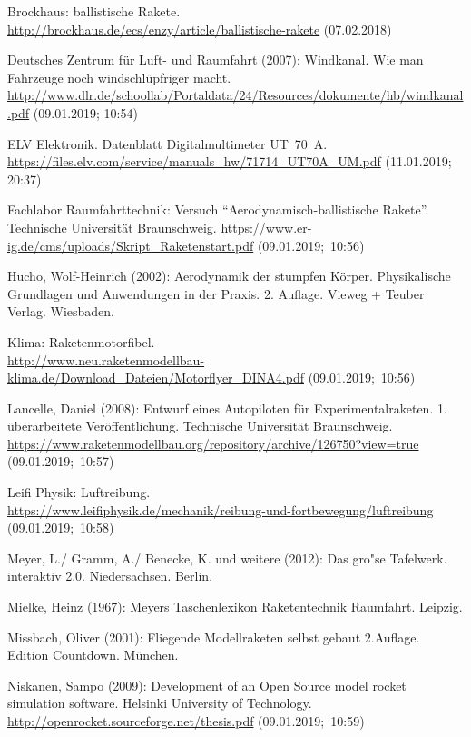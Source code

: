 \documentclass[10pt,a4paper]{article}
\begin{document}
\newpage
\begin{thebibliography}{99}
	Brockhaus: ballistische Rakete. \\
	\url{http://brockhaus.de/ecs/enzy/article/ballistische-rakete} (07.02.2018)
	
	Deutsches Zentrum für Luft- und Raumfahrt (2007): Windkanal. Wie man Fahrzeuge noch windschlüpfriger macht.\\
	\url{http://www.dlr.de/schoollab/Portaldata/24/Resources/dokumente/hb/windkanal.pdf} (09.01.2019; 10:54)
	
	ELV Elektronik. Datenblatt Digitalmultimeter UT~70~A.
	\url{https://files.elv.com/service/manuals_hw/71714_UT70A_UM.pdf} (11.01.2019; 20:37)
	
	Fachlabor Raumfahrttechnik: Versuch "`Aerodynamisch-ballistische Rakete"'. Technische Universität Braunschweig.
	\url{https://www.er-ig.de/cms/uploads/Skript_Raketenstart.pdf} (09.01.2019;~10:56)
	
	Hucho, Wolf-Heinrich (2002): Aerodynamik der stumpfen Körper. Physikalische Grundlagen und Anwendungen in der Praxis. 2. Auflage. Vieweg + Teuber Verlag. Wiesbaden.
	
	Klima: Raketenmotorfibel. \\
	\url{http://www.neu.raketenmodellbau-klima.de/Download_Dateien/Motorflyer_DINA4.pdf} (09.01.2019;~10:56)
	
	Lancelle, Daniel (2008): Entwurf eines Autopiloten für Experimentalraketen. 1. überarbeitete Veröffentlichung.
	Technische Universität Braunschweig.
	\url{https://www.raketenmodellbau.org/repository/archive/126750?view=true} (09.01.2019;~10:57)
	
	Leifi Physik: Luftreibung.\\ \url{https://www.leifiphysik.de/mechanik/reibung-und-fortbewegung/luftreibung} (09.01.2019;~10:58)
	
	Meyer, L./ Gramm, A./ Benecke, K. und weitere (2012): Das gro"se Tafelwerk. interaktiv 2.0. Niedersachsen. Berlin. 
	
	Mielke, Heinz (1967): Meyers Taschenlexikon Raketentechnik Raumfahrt. Leipzig. 
	
	Missbach, Oliver (2001): Fliegende Modellraketen selbst gebaut 2.Auflage. Edition Countdown. München. 
	
	Niskanen, Sampo (2009): Development of an Open Source model rocket simulation software. Helsinki University of Technology. \url{http://openrocket.sourceforge.net/thesis.pdf} (09.01.2019;~10:59)
	

\end{thebibliography}
\end{document}
